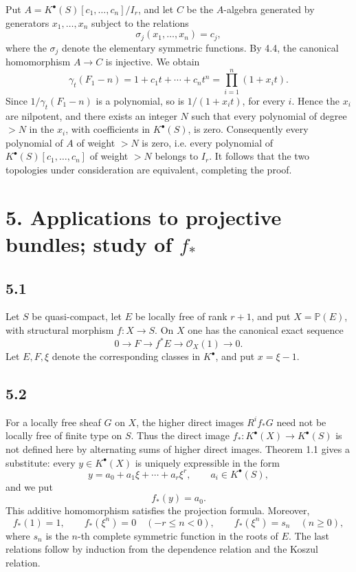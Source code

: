 Put \(A=K^\bullet(S)[c_1,\ldots,c_n]/I_r\), and let \(C\) be the \(A\)-algebra generated by generators \(x_1,\ldots,x_n\) subject to the relations
\[
  \sigma_j(x_1,\ldots,x_n)=c_j,
\]
where the \(\sigma_j\) denote the elementary symmetric functions. By 4.4, the canonical homomorphism \(A\to C\) is injective. We obtain
\[
  \gamma_t(F_1-n)
  =1+c_1t+\cdots+c_nt^n
  =\prod_{i=1}^n(1+x_it).
\]
Since \(1/\gamma_t(F_1-n)\) is a polynomial, so is \(1/(1+x_it)\), for every \(i\). Hence the \(x_i\) are nilpotent, and there exists an integer \(N\) such that every polynomial of degree \(>N\) in the \(x_i\), with coefficients in \(K^\bullet(S)\), is zero. Consequently every polynomial of \(A\) of weight \(>N\) is zero, i.e. every polynomial of \(K^\bullet(S)[c_1,\ldots,c_n]\) of weight \(>N\) belongs to \(I_r\). It follows that the two topologies under consideration are equivalent, completing the proof.

\section*{5. Applications to projective bundles; study of \(f_*\)}

\subsection*{5.1}
Let \(S\) be quasi-compact, let \(E\) be locally free of rank \(r+1\), and put \(X=\mathbb P(E)\), with structural morphism \(f:X\to S\). On \(X\) one has the canonical exact sequence
\[
  0\longrightarrow F\longrightarrow f^*E\longrightarrow \mathcal O_X(1)\longrightarrow 0.
\]
Let \(E,F,\xi\) denote the corresponding classes in \(K^\bullet\), and put \(x=\xi-1\).

\subsection*{5.2}
For a locally free sheaf \(G\) on \(X\), the higher direct images \(R^if_*G\) need not be locally free of finite type on \(S\). Thus the direct image \(f_*:K^\bullet(X)\to K^\bullet(S)\) is not defined here by alternating sums of higher direct images. Theorem 1.1 gives a substitute: every \(y\in K^\bullet(X)\) is uniquely expressible in the form
\[
  y=a_0+a_1\xi+\cdots+a_r\xi^r,
  \qquad a_i\in K^\bullet(S),
\]
and we put
\[
  f_*(y)=a_0.
\]
This additive homomorphism satisfies the projection formula. Moreover,
\[
  f_*(1)=1,
  \qquad
  f_*(\xi^n)=0\quad(-r\leq n<0),
  \qquad
  f_*(\xi^n)=s_n\quad(n\geq 0),
\]
where \(s_n\) is the \(n\)-th complete symmetric function in the roots of \(E\). The last relations follow by induction from the dependence relation and the Koszul relation.

